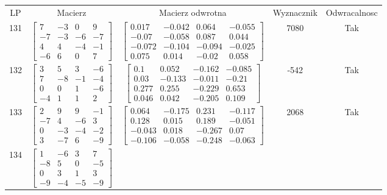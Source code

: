 \documentclass[a4paper,12pt]{article}
\begin{document}
\bgroup {} \vspace{0.2in} \begin{tabular}{c c c c c}
LP & Macierz & Macierz odwrotna & Wyznacznik & Odwracalnosc\\
131
&
$\begin{bmatrix} 7 & -3 & 0 & 9 \\ -7 & -3 & -6 & -7 \\ 4 & 4 & -4 & -1 \\ -6 & 6 & 0 & 7 \end{bmatrix}$
&
$\begin{bmatrix} 0.017 & -0.042 & 0.064 & -0.055 \\ -0.07 & -0.058 & 0.087 & 0.044 \\ -0.072 & -0.104 & -0.094 & -0.025 \\ 0.075 & 0.014 & -0.02 & 0.058 \end{bmatrix}$
&
7080
&
Tak
\\
132
&
$\begin{bmatrix} 3 & 5 & 3 & -6 \\ 7 & -8 & -1 & -4 \\ 0 & 0 & 1 & -6 \\ -4 & 1 & 1 & 2 \end{bmatrix}$
&
$\begin{bmatrix} 0.1 & 0.052 & -0.162 & -0.085 \\ 0.03 & -0.133 & -0.011 & -0.21 \\ 0.277 & 0.255 & -0.229 & 0.653 \\ 0.046 & 0.042 & -0.205 & 0.109 \end{bmatrix}$
&
-542
&
Tak
\\
133
&
$\begin{bmatrix} 2 & 9 & 9 & -1 \\ -7 & 4 & -6 & 3 \\ 0 & -3 & -4 & -2 \\ 3 & -7 & 6 & -9 \end{bmatrix}$
&
$\begin{bmatrix} 0.064 & -0.175 & 0.231 & -0.117 \\ 0.128 & 0.015 & 0.189 & -0.051 \\ -0.043 & 0.018 & -0.267 & 0.07 \\ -0.106 & -0.058 & -0.248 & -0.063 \end{bmatrix}$
&
2068
&
Tak
\\
134
&
$\begin{bmatrix} 1 & -6 & 3 & 7 \\ -8 & 5 & 0 & -5 \\ 0 & 3 & 1 & 3 \\ -9 & -4 & -5 & -9 \end{bmatrix}$

\end{tabular}
\end{document}

